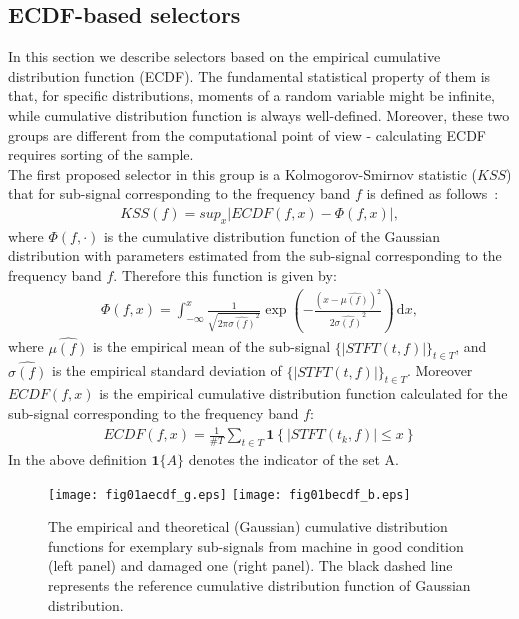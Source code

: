 \documentclass[3p,times]{elsarticle}
\begin{document}
\subsection{ECDF-based selectors}
In this section we describe selectors based on the empirical cumulative distribution function (ECDF). The fundamental statistical property of them is that, for specific distributions, moments of a random variable might be infinite, while cumulative distribution function is always well-defined. Moreover, these two groups are different from the computational point of view - calculating ECDF requires sorting of the sample.\\
The first proposed selector in this group is a Kolmogorov-Smirnov  statistic ($KSS$) that for sub-signal corresponding to the frequency band $f$ is defined as follows~\cite{bib03,bib04}:
\begin{eqnarray}\label{K-S}
KSS(f)=sup_x\left|ECDF(f,x)-\Phi(f,x)\right|,
\end{eqnarray}
where $\Phi(f,\cdot)$ is the cumulative distribution function of the Gaussian distribution with parameters estimated from the sub-signal corresponding to the frequency band $f$. Therefore this function is given by:
\begin{eqnarray}\label{FF}\Phi(f,x)=\int^{x}_{-\infty} \! \frac{1}{\sqrt{2\pi\widehat{\sigma(f)}^2}}\exp \left( -\frac{\left(x-\widehat{\mu(f)}\right)^2}{2\widehat{\sigma(f)}^2} \right) \, \mathrm{d} x,\end{eqnarray}
where $\widehat{\mu(f)}$ is the empirical mean of the sub-signal $\{|STFT(t,f)|\}_{t\in T}$, and $\widehat{\sigma(f)}$ is the empirical standard deviation of  $\{|STFT(t,f)|\}_{t\in T}$. Moreover $ECDF(f,x)$ is the empirical cumulative distribution function calculated for the sub-signal corresponding to the frequency band $f$:
\begin{eqnarray}\label{ECDF}
ECDF(f,x)=\frac{1}{\#T}\sum_{t\in T}\mathbf{1}\left\{ |STFT(t_k,f)|\leq x\right\}
\end{eqnarray}
In the above definition $\mathbf{1}\{A\}$ denotes the indicator of the set A.\\
\begin{figure}[!ht]
\begin{center}
\texttt{[image: fig01aecdf\_g.eps]}
\texttt{[image: fig01becdf\_b.eps]}
\caption{The empirical and theoretical (Gaussian) cumulative distribution functions for exemplary sub-signals from machine in good condition (left panel) and damaged one (right panel). The black dashed line represents the reference cumulative distribution function of Gaussian distribution.}\label{fig1}
\end{center}
\end{figure}
\end{document}
